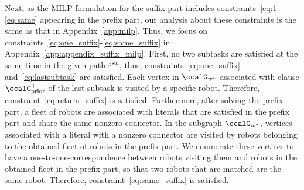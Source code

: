 \documentclass[Afour,sageh,times]{sagej}
\begin{document}
{{Next, as the MILP formulation for the suffix part includes constraints~\eqref{eq:1}-\eqref{eq:same} appearing in the prefix part, our analysis about these constraints is the same as that in Appendix~\ref{app:milp}. Thus, we focus on constraints~\eqref{eq:one_suffix}-\eqref{eq:same_suffix} in Appendix~\ref{app:appendix_suffix_milp}. First, no two subtasks are satisfied at the same time in the given path $\overline{\tau}^{\text{suf}}$, thus, constraints~\eqref{eq:one_suffix} and~\eqref{eq:lastsubtask} are  satisfied. Each vertex in $\ccalG_{w^*}$  associated with  clause $\ccalC_{\text{prior}}^+$ of the last subtask is visited by a specific  robot. Therefore, constraint~\eqref{eq:return_suffix} is satisfied. %
Furthermore, after solving  the prefix part, a fleet of robots are associated with literals that are  satisfied in the prefix part and share the same nonzero connector. In the subgraph $\ccalG_{w^*}$,  vertices   associated with a literal with a nonzero connector are visited by  robots belonging to the obtained fleet of robots in the prefix part. We enumerate these vertices to  have a one-to-one-correspondence between robots visiting them and robots in the obtained fleet in the prefix part, so that  two  robots that are matched  are the same robot. Therefore, constraint~\eqref{eq:same_suffix} is satisfied.

}}
\end{document}

